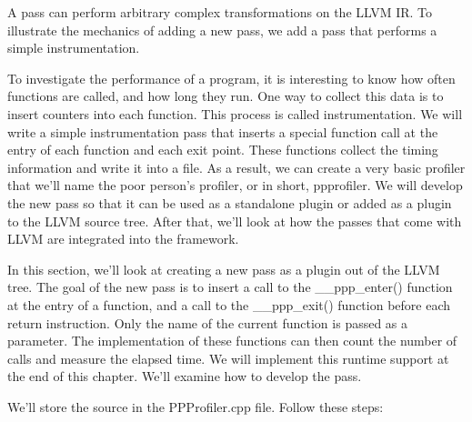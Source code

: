 
A pass can perform arbitrary complex transformations on the LLVM IR. To illustrate the mechanics of adding a new pass, we add a pass that performs a simple instrumentation.

To investigate the performance of a program, it is interesting to know how often functions are called, and how long they run. One way to collect this data is to insert counters into each function. This process is called instrumentation. We will write a simple instrumentation pass that inserts a special function call at the entry of each function and each exit point. These functions collect the timing information and write it into a file. As a result, we can create a very basic profiler that we’ll name the poor person’s profiler, or in short, ppprofiler. We will develop the new pass so that it can be used as a standalone plugin or added as a plugin to the LLVM source tree. After that, we’ll look at how the passes that come with LLVM are integrated into the framework.


In this section, we’ll look at creating a new pass as a plugin out of the LLVM tree. The goal of the new pass is to insert a call to the \_\_ppp\_enter() function at the entry of a function, and a call to the \_\_ppp\_exit() function before each return instruction. Only the name of the current function is passed as a parameter. The implementation of these functions can then count the number of calls and measure the elapsed time. We will implement this runtime support at the end of this chapter. We’ll examine how to develop the pass.

We’ll store the source in the PPProfiler.cpp file. Follow these steps:

